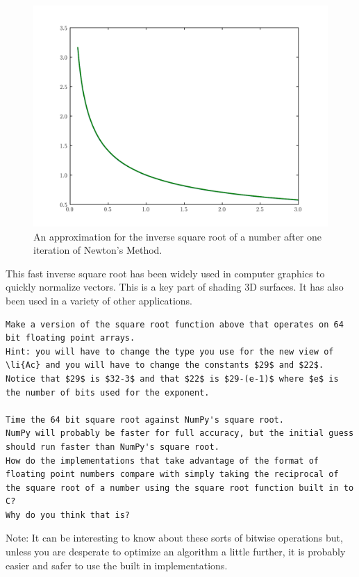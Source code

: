 \begin{figure}
\includegraphics[width=\textwidth]{invsqrt1}
\caption{An approximation for the inverse square root of a number after one iteration of Newton's Method.}
\label{float:invsqrt1}
\end{figure}

This fast inverse square root has been widely used in computer graphics to quickly normalize vectors.
This is a key part of shading 3D surfaces.
It has also been used in a variety of other applications.

\begin{lstlisting}
Make a version of the square root function above that operates on 64 bit floating point arrays.
Hint: you will have to change the type you use for the new view of \li{Ac} and you will have to change the constants $29$ and $22$.
Notice that $29$ is $32-3$ and that $22$ is $29-(e-1)$ where $e$ is the number of bits used for the exponent.

Time the 64 bit square root against NumPy's square root.
NumPy will probably be faster for full accuracy, but the initial guess should run faster than NumPy's square root.
How do the implementations that take advantage of the format of floating point numbers compare with simply taking the reciprocal of the square root of a number using the square root function built in to C?
Why do you think that is?
\end{lstlisting}

Note: It can be interesting to know about these sorts of bitwise operations but, unless you are desperate to optimize an algorithm a little further, it is probably easier and safer to use the built in implementations.
